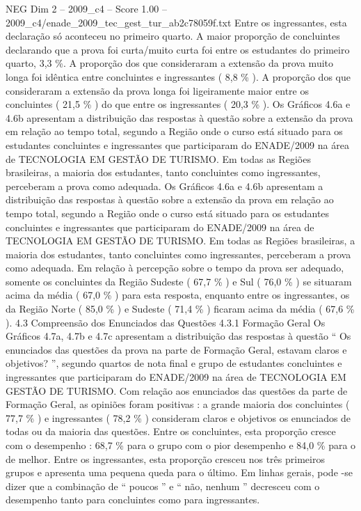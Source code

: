 \begin{textsample}{NEG Dim 2 – 2009\_c4 – Score 1.00 – 2009\_c4/enade\_2009\_tec\_gest\_tur\_ab2c78059f.txt}
Entre os ingressantes, esta declaração só aconteceu no primeiro quarto.
A maior proporção de concluintes declarando que a prova foi curta/muito curta foi entre os estudantes do primeiro quarto, 3,3 \%.
A proporção dos que consideraram a extensão da prova muito longa foi idêntica entre concluintes e ingressantes ( 8,8 \% ).
A proporção dos que consideraram a extensão da prova longa foi ligeiramente maior entre os concluintes ( 21,5 \% ) do que entre os ingressantes ( 20,3 \% ).
Os Gráficos 4.6a e 4.6b apresentam a distribuição das respostas à questão sobre a extensão da prova em relação ao tempo total, segundo a Região onde o curso está situado para os estudantes concluintes e ingressantes que participaram do ENADE/2009 na área de TECNOLOGIA EM GESTÃO DE TURISMO.
Em todas as Regiões brasileiras, a maioria dos estudantes, tanto concluintes como ingressantes, perceberam a prova como adequada.
Os Gráficos 4.6a e 4.6b apresentam a distribuição das respostas à questão sobre a extensão da prova em relação ao tempo total, segundo a Região onde o curso está situado para os estudantes concluintes e ingressantes que participaram do ENADE/2009 na área de TECNOLOGIA EM GESTÃO DE TURISMO.
Em todas as Regiões brasileiras, a maioria dos estudantes, tanto concluintes como ingressantes, perceberam a prova como adequada.
Em relação à percepção sobre o tempo da prova ser adequado, somente os concluintes da Região Sudeste ( 67,7 \% ) e Sul ( 76,0 \% ) se situaram acima da média ( 67,0 \% ) para esta resposta, enquanto entre os ingressantes, os da Região Norte ( 85,0 \% ) e Sudeste ( 71,4 \% ) ficaram acima da média ( 67,6 \% ). 4.3 Compreensão dos Enunciados das Questões 4.3.1 Formação Geral Os Gráficos 4.7a, 4.7b e 4.7c apresentam a distribuição das respostas à questão “ Os enunciados das questões da prova na parte de Formação Geral, estavam claros e objetivos? ”, segundo quartos de nota final e grupo de estudantes concluintes e ingressantes que participaram do ENADE/2009 na área de TECNOLOGIA EM GESTÃO DE TURISMO.
Com relação aos enunciados das questões da parte de Formação Geral, as opiniões foram positivas : a grande maioria dos concluintes ( 77,7 \% ) e ingressantes ( 78,2 \% ) consideram claros e objetivos os enunciados de todas ou da maioria das questões.
Entre os concluintes, esta proporção cresce com o desempenho : 68,7 \% para o grupo com o pior desempenho e 84,0 \% para o de melhor.
Entre os ingressantes, esta proporção cresceu nos três primeiros grupos e apresenta uma pequena queda para o último.
Em linhas gerais, pode -se dizer que a combinação de “ poucos ” e “ não, nenhum ” decresceu com o desempenho tanto para concluintes como para ingressantes.

\end{textsample}
